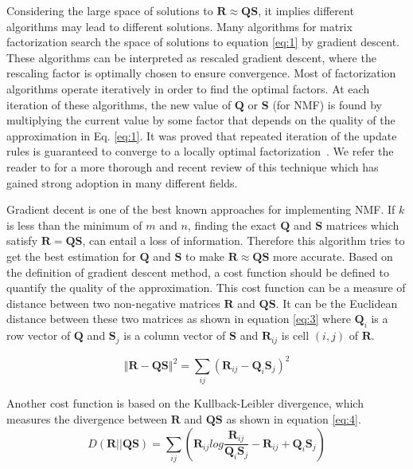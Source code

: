 Considering the large space of solutions to $\mathbf{R}\approx\mathbf{Q}\mathbf{S}$, it implies different algorithms may lead to different solutions. Many algorithms for matrix factorization search the space of solutions to equation \eqref{eq:1} by gradient descent. These algorithms can be interpreted as rescaled gradient descent, where the rescaling factor is optimally chosen to ensure convergence. Most of factorization algorithms operate iteratively in order to find the optimal factors. At each iteration of these algorithms, the new value of $\mathbf{Q}$ or $\mathbf{S}$ (for \ac{NMF}) is found by multiplying the current value by some factor that depends on the quality of the approximation in Eq. \eqref{eq:1}. It was proved that repeated iteration of the update rules is guaranteed to converge to a locally optimal factorization~\citep{seung2001algorithms}. We refer the reader to \citep{Berry2007} for a more thorough and recent review of this technique which has gained strong adoption in many different fields. 

Gradient decent is one of the best known approaches for implementing  \ac{NMF}.  If $k$ is less than the minimum of $m$ and $n$, finding the exact $\mathbf{Q}$ and $\mathbf{S}$ matrices which satisfy $\mathbf{R}=\mathbf{Q}\mathbf{S}$, can entail a loss of information. Therefore this algorithm tries to get the best estimation for $\mathbf{Q}$ and $\mathbf{S}$ to make $\mathbf{R}\approx\mathbf{Q}\mathbf{S}$ more accurate. Based on the definition of gradient descent method, a cost function should be defined to quantify the quality of the approximation. This cost function can be a measure of distance between two non-negative matrices $\mathbf{R}$ and $\mathbf{Q}\mathbf{S}$. It  can be the Euclidean distance between these two matrices as shown in equation \eqref{eq:3} where $\mathbf{Q}_{i}$ is a row vector of $\mathbf{Q}$ and $\mathbf{S}_{j}$ is a column vector of $\mathbf{S}$ and $\mathbf{R}_{ij}$ is cell $(i,j)$ of $\mathbf{R}$.

\begin{equation}
\left\Vert \mathbf{R}-\mathbf{Q}\mathbf{S}\right\Vert ^{2}=\sum_{{\scriptscriptstyle ij}}(\mathbf{R}_{ij}-\mathbf{Q}_{i}\mathbf{S}_{j})^2\label{eq:3}
\end{equation}


  
Another cost function  is based on the Kullback-Leibler divergence, which measures the divergence between $\mathbf{R}$ and $\mathbf{Q}\mathbf{S}$ as shown in equation \eqref{eq:4}. 
\begin{equation}
D(\mathbf{R}||\mathbf{Q}\mathbf{S})=\sum_{{\scriptscriptstyle ij}}(\mathbf{R}_{ij}log\frac{\mathbf{R}_{ij}}{\mathbf{Q}_{i}\mathbf{S}_{j}}-\mathbf{R}_{ij}+\mathbf{Q}_{i}\mathbf{S}_{j})\label{eq:4}
\end{equation}


